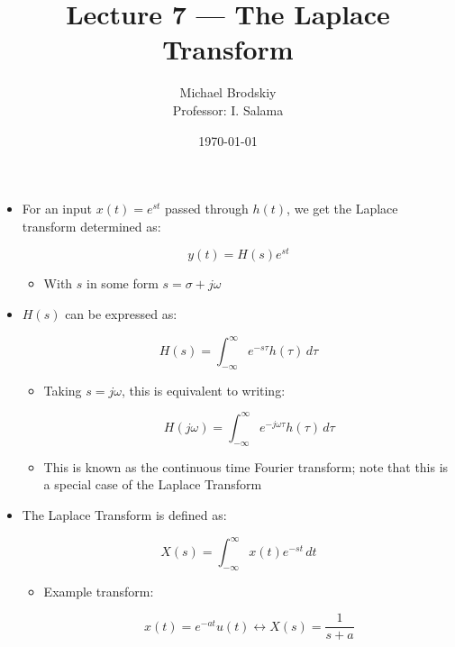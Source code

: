 


\title{Lecture 7 — The Laplace Transform}
\date{\today}
\author{Michael Brodskiy\\ \small Professor: I. Salama}



\maketitle

\begin{itemize}

  \item For an input $x(t)=e^{st}$ passed through $h(t)$, we get the Laplace transform determined as:

    $$y(t)=H(s)e^{st}$$

    \begin{itemize}

      \item With $s$ in some form $s=\sigma+j\omega$
        
    \end{itemize}

  \item $H(s)$ can be expressed as:

    $$H(s)=\int_{-\infty}^{\infty} e^{-s\tau}h(\tau)\,d\tau$$

    \begin{itemize}

      \item Taking $s=j\omega$, this is equivalent to writing:

        $$H(j\omega)=\int_{-\infty}^{\infty} e^{-j\omega\tau}h(\tau)\,d\tau$$

      \item This is known as the continuous time Fourier transform; note that this is a special case of the Laplace Transform

    \end{itemize}

  \item The Laplace Transform is defined as:

    $$X(s)=\int_{-\infty}^{\infty}x(t)e^{-st}\,dt$$

    \begin{itemize}

      \item Example transform:

        $$x(t)=e^{-at}u(t)\longleftrightarrow X(s)=\frac{1}{s+a}$$

    \end{itemize}

\end{itemize}



